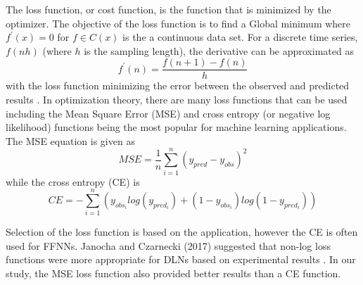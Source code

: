 \documentclass[preprint,12pt,authoryear]{elsarticle}
\begin{document}
\begin{linenumbers}
The loss function, or cost function, is the function that is minimized by the optimizer. The objective of the loss function is to find a Global minimum where $f^{'}(x) = 0$ for $f \in C(x)$ is the a continuous data set. For a discrete time series, $f(nh)$ (where $h$ is the sampling length), the derivative can be approximated as
%
\begin{equation}
\label{eq:discretediff}
f^{'}(n) = \frac{f(n+1) - f(n)}{h} 
\end{equation}
%
with the loss function minimizing the error between the observed and predicted  results \citep{Goodfellow2016}. In optimization theory, there are many loss functions that can be used including the Mean Square Error (MSE) and cross entropy (or negative log likelihood) functions being the most popular for machine learning applications.  The MSE equation is given as 
%
\begin{equation}
\label{eq:MSE}
MSE = \frac{1}{n} \sum_{i=1}^{n} \left( y_{pred} - y_{obs} \right)^{2}
\end{equation}
%
while the cross entropy (CE) is 
%
\begin{equation}
\label{eq:N}
CE = - \sum_{i=1}^{n}\left (y_{obs_i}log(y_{pred_i}) + (1-y_{obs_i})log(1-y_{pred_i})  \right )
\end{equation}

Selection of the loss function is based on the application, however the CE is often used for FFNNs. Janocha and Czarnecki (2017) suggested that non-log loss functions were more appropriate for DLNs based on experimental results \citep{Janocha2017}. In our study, the MSE loss function also provided better results than a CE function.
%

\end{linenumbers}
\end{document}

